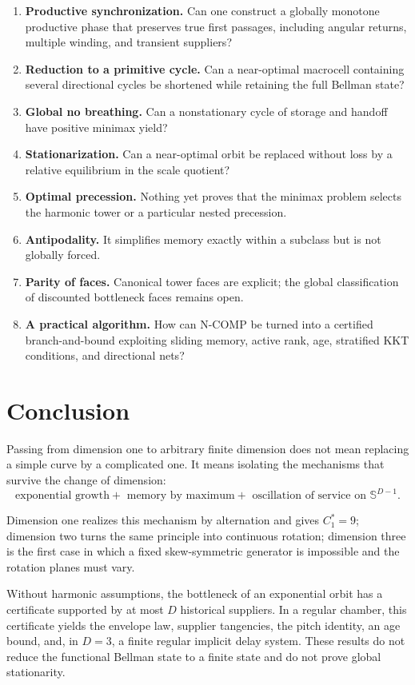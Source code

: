 \documentclass[10pt,a4paper]{article}
\newcommand{\Sph}{\mathbb{S}}
\newcommand{\cstar}{C^{*}}
\theoremstyle{plain}
\theoremstyle{definition}
\theoremstyle{remark}
\begin{document}
\begin{enumerate}[label=\arabic*.]
\item \textbf{Productive synchronization.} Can one construct a globally monotone productive phase that preserves true first passages, including angular returns, multiple winding, and transient suppliers?
\item \textbf{Reduction to a primitive cycle.} Can a near-optimal macrocell containing several directional cycles be shortened while retaining the full Bellman state?
\item \textbf{Global no breathing.} Can a nonstationary cycle of storage and handoff have positive minimax yield?
\item \textbf{Stationarization.} Can a near-optimal orbit be replaced without loss by a relative equilibrium in the scale quotient?
\item \textbf{Optimal precession.} Nothing yet proves that the minimax problem selects the harmonic tower or a particular nested precession.
\item \textbf{Antipodality.} It simplifies memory exactly within a subclass but is not globally forced.
\item \textbf{Parity of faces.} Canonical tower faces are explicit; the global classification of discounted bottleneck faces remains open.
\item \textbf{A practical algorithm.} How can N-COMP be turned into a certified branch-and-bound exploiting sliding memory, active rank, age, stratified KKT conditions, and directional nets?
\end{enumerate}

\section{Conclusion}

Passing from dimension one to arbitrary finite dimension does not mean replacing a simple curve by a complicated one. It means isolating the mechanisms that survive the change of dimension:
\[
  \text{exponential growth}
  +\text{ memory by maximum}
  +\text{ oscillation of service on }\Sph^{D-1}.
\]

Dimension one realizes this mechanism by alternation and gives $\cstar_1=9$; dimension two turns the same principle into continuous rotation; dimension three is the first case in which a fixed skew-symmetric generator is impossible and the rotation planes must vary.

Without harmonic assumptions, the bottleneck of an exponential orbit has a certificate supported by at most $D$ historical suppliers. In a regular chamber, this certificate yields the envelope law, supplier tangencies, the pitch identity, an age bound, and, in $D=3$, a finite regular implicit delay system. These results do not reduce the functional Bellman state to a finite state and do not prove global stationarity.
\end{document}

